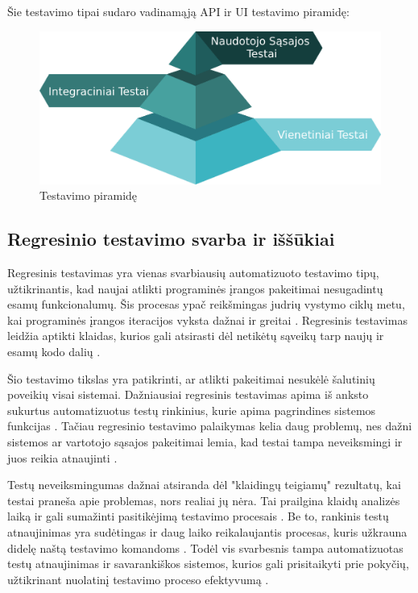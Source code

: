 \documentclass[
]{VUMIFPSkursinis}
\begin{document}
Šie testavimo tipai sudaro vadinamąją API ir UI testavimo piramidę:

\begin{figure}[H]
    \centering
    \includegraphics[scale=0.25]{img/Piramide.png}
    \caption{Testavimo piramidę}
    \label{img:piramide}
\end{figure}

\subsection{Regresinio testavimo svarba ir iššūkiai}

Regresinis testavimas yra vienas svarbiausių automatizuoto testavimo tipų, užtikrinantis, kad naujai atlikti programinės įrangos pakeitimai nesugadintų esamų funkcionalumų. Šis procesas ypač reikšmingas judrių vystymo ciklų metu, kai programinės įrangos iteracijos vyksta dažnai ir greitai \cite{kaner2002}. Regresinis testavimas leidžia aptikti klaidas, kurios gali atsirasti dėl netikėtų sąveikų tarp naujų ir esamų kodo dalių \cite{black2009}.

Šio testavimo tikslas yra patikrinti, ar atlikti pakeitimai nesukėlė šalutinių poveikių visai sistemai. Dažniausiai regresinis testavimas apima iš anksto sukurtus automatizuotus testų rinkinius, kurie apima pagrindines sistemos funkcijas \cite{fewster1999}. Tačiau regresinio testavimo palaikymas kelia daug problemų, nes dažni sistemos ar vartotojo sąsajos pakeitimai lemia, kad testai tampa neveiksmingi ir juos reikia atnaujinti \cite{whittaker2000}.

Testų neveiksmingumas dažnai atsiranda dėl "klaidingų teigiamų" rezultatų, kai testai praneša apie problemas, nors realiai jų nėra. Tai prailgina klaidų analizės laiką ir gali sumažinti pasitikėjimą testavimo procesais \cite{fewster1999}. Be to, rankinis testų atnaujinimas yra sudėtingas ir daug laiko reikalaujantis procesas, kuris užkrauna didelę naštą testavimo komandoms \cite{black2009}. Todėl vis svarbesnis tampa automatizuotas testų atnaujinimas ir savarankiškos sistemos, kurios gali prisitaikyti prie pokyčių, užtikrinant nuolatinį testavimo proceso efektyvumą \cite{kaner2002}.
\end{document}
